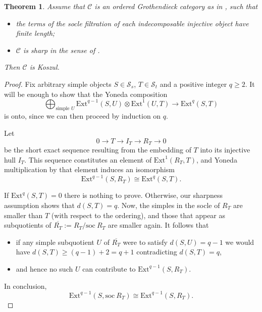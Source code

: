 \documentclass[11pt]{article}
\theoremstyle{plain}
\newtheorem{theorem}[lemma]{Theorem}
\theoremstyle{nonumberplain}
\theoremstyle{plain}
\numberwithin{equation}{section}
\theoremstyle{nonumberplain}
\newtheorem{proof}{Proof}
\newcommand\cC{{\mathcal C}}
\newcommand\cS{{\mathcal S}}
\newcommand\1{{\bf 1}}
\begin{document}
\begin{theorem}\label{thm:kosz-gen}
  Assume that $\cC$ is an ordered Grothendieck category as in , 
  such that
  \begin{itemize}
  \item[$-$] the terms of the socle filtration of each indecomposable injective object have finite length;
  \item[$-$] $\cC$ is sharp in the sense of .    
  \end{itemize}
  Then $\cC$ is Koszul. 
\end{theorem}
\begin{proof}
  Fix arbitrary simple objects $S\in \cS_s$, $T\in \cS_t$ and a positive integer $q\ge 2$. It will be enough to show that the Yoneda composition
  \begin{equation*}
    \bigoplus_{\text{simple }U}\mathrm{Ext}^{q-1}(S,U)\otimes \mathrm{Ext}^1(U,T)\to \mathrm{Ext}^q(S,T)
  \end{equation*}
  is onto, since we can then proceed by induction on $q$. 

  Let
  \begin{equation*}
    0\to T\to I_T\to R_T\to 0
  \end{equation*}
  be the short exact sequence resulting from the embedding of $T$ into its injective hull $I_T$. This sequence constitutes an element of $\mathrm{Ext}^1(R_T,T)$, and Yoneda multiplication by that element induces an isomorphism
  \begin{equation*}
    \mathrm{Ext}^{q-1}(S,R_T)\cong \mathrm{Ext}^q(S,T). 
  \end{equation*}

  If $\mathrm{Ext}^q(S,T)=0$ there is nothing to prove. Otherwise, our sharpness assumption shows that $d(S,T)=q$. Now, the simples in the socle of $R_T$ are smaller than $T$ (with respect to the ordering), and those that appear as subquotients of $\overline{R_T}:=R_T/\mathrm{soc}~R_T$ are smaller again. It follows that
  \begin{itemize}
  \item[$-$] if any simple subquotient $U$ of $\overline{R_T}$ were to satisfy $d(S,U)=q-1$ we would have $d(S,T)\ge (q-1)+2=q+1$ contradicting $d(S,T)=q$,
  \item[$-$] and hence no such $U$ can contribute to $\mathrm{Ext}^{q-1}(S,R_T)$.
   \end{itemize}
 \noindent In conclusion,
    \begin{equation}\label{eq:eq-1}
      \mathrm{Ext}^{q-1}(S,\mathrm{soc}~R_T) \cong \mathrm{Ext}^{q-1}(S,R_T).
    \end{equation}


\end{proof}
\end{document}
